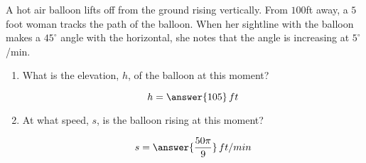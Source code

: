 \documentclass{ximera}
\author{Gregory Hartman \and Matthew Carr}
\begin{document}
\begin{exercise}




A hot air balloon lifts off from the ground rising vertically. From
$100$ft away, a $5$ foot woman tracks the path of the balloon. When
her sightline with the balloon makes a $45^{\circ}$ angle with the
horizontal, she notes that the angle is increasing at $5^{\circ}$/min.

\begin{enumerate}
\item What is the elevation, $h$, of the balloon at this moment? \begin{prompt}\[h=\answer{105}\,ft\]\end{prompt}
\item At what speed, $s$, is the balloon rising at this moment? \begin{prompt}\[s=\answer{\frac{50\pi}{9}}\,ft/min\]\end{prompt}
\end{enumerate}


\end{exercise}
\end{document}
